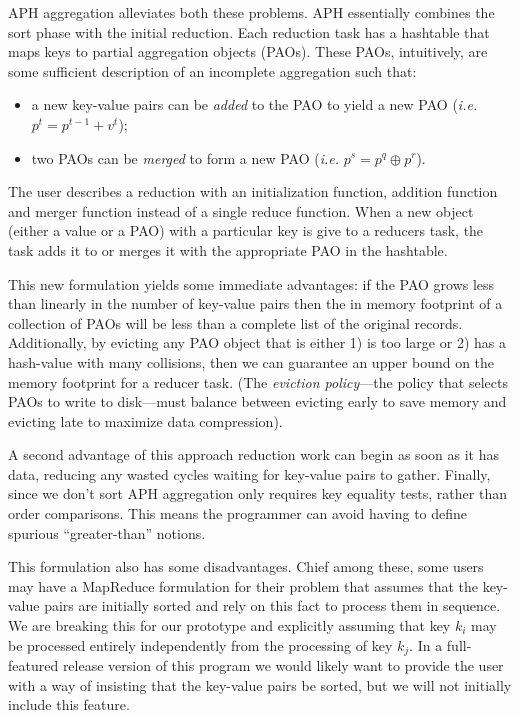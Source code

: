 \documentclass[10pt,letter,final,article,twocolumn]{article} %
\begin{document}
 APH aggregation alleviates both these problems. APH essentially combines the sort phase with the initial reduction. Each reduction task has a hashtable that maps keys to partial aggregation objects (PAOs). These PAOs, intuitively, are some sufficient description of an incomplete aggregation such that:
\begin{itemize}
 \item a new key-value pairs can be \emph{added} to the PAO to yield a new PAO (\emph{i.e.} $p^t = p^{t-1} + v^t$);
 \item two PAOs can be \emph{merged} to form a new PAO (\emph{i.e.} $p^s = p^q \oplus p^r$).
\end{itemize}
The user describes a reduction with an initialization function, addition function and merger function instead of a single reduce function. When a new object (either a value or a PAO) with a particular key is give to a reducers task, the task adds it to or merges it with the appropriate PAO in the hashtable.

This new formulation yields some immediate advantages: if the PAO grows less than linearly in the number of key-value pairs then the in memory footprint of a collection of PAOs will be less than a complete list of the original records. Additionally, by evicting any PAO object that is either 1) is too large or 2) has a hash-value with many collisions, then we can guarantee an upper bound on the memory footprint for a reducer task. (The \emph{eviction policy}---the policy that selects PAOs to write to disk---must balance between evicting early to save memory and evicting late to maximize data compression).  

A second advantage of this approach reduction work can begin as soon as it has data, reducing any wasted cycles waiting for key-value pairs to gather. Finally, since we don't sort APH aggregation only requires key equality tests, rather than order comparisons. This means the programmer can avoid having to define spurious ``greater-than'' notions.

This formulation also has some disadvantages. Chief among these, some users may have a MapReduce formulation for their problem that assumes that the key-value pairs are initially sorted and rely on this fact to process them in sequence. We are breaking this for our prototype and explicitly assuming that key $k_i$ may be processed entirely independently from the processing of key $k_j$. In a full-featured release version of this program we would likely want to provide the user with a way of insisting that the key-value pairs be sorted, but we will not initially include this feature.
\end{document}
